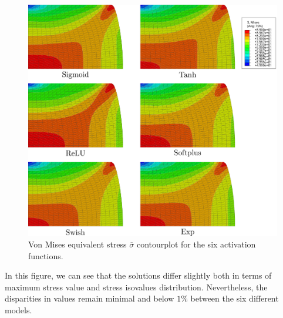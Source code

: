\documentclass[algorithms,article,submit,pdftex,oneauthors]{Definitions/mdpi}
\begin{document}
\begin{figure}[h!]
\centering
\includegraphics[width=0.9\columnwidth]{Figures/MisesHalf}
\caption{Von Mises equivalent stress $\overline{\sigma}$ contourplot for the six activation functions.}
\label{fig:Num-misesCP}
\end{figure}
In this figure, we can see that the solutions differ slightly both in terms of maximum stress value and stress isovalues distribution.
Nevertheless, the disparities in values remain minimal and below $1\%$ between the six different models.
\end{document}
